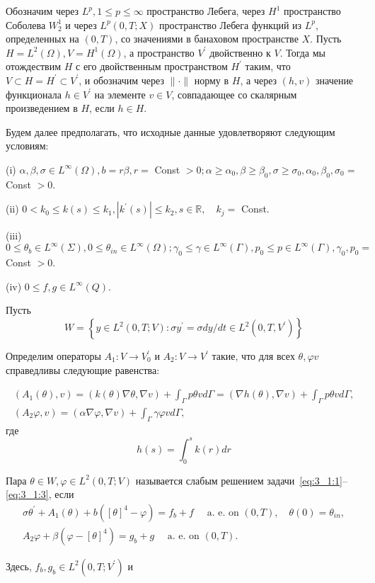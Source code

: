 Обозначим через $L^{p}, 1 \leq p \leq \infty$ пространство Лебега, через $H^{1}$
пространство Соболева $W_{2}^{1}$ и через $L^ {p}(0, T ; X)$ пространство Лебега
функций из $L^{p}$, определенных на $(0, T)$,
со значениями в банаховом пространстве $X$.
Пусть $H=L^{2}(\Omega), V=H^{1}(\Omega)$, а пространство $V^{\prime}$ двойственно к $V$.
Тогда мы отождествим $H$ с его двойственным пространством $H^{\prime}$ таким,
что $V \subset H=H^{\prime} \subset V^{\prime}$, и обозначим через $\|\cdot \|$ норму в $H$,
а через $(h, v)$ значение функционала $h \in V^{\prime}$ на элементе $v \in V$,
совпадающее со скалярным произведением в $ H$, если $h \in H$.


Будем далее предполагать, что исходные данные удовлетворяют следующим условиям:

(i) $\alpha, \beta, \sigma \in L^{\infty}(\Omega), b=r \beta, r=$ Const $>0;
\alpha \geq \alpha_{0}, \beta \geq \beta_{0},
\sigma \geq \sigma_{0}, \alpha_{0}, \beta_{0}, \sigma_{0}=$ Const $>0$.

(ii) $0<k_{0} \leq k(s) \leq k_{1},\left|k^{\prime}(s)\right| \leq k_{2}, s \in \mathbb{R},
\quad k_{j}=$ Const.

(iii) $0 \leq \theta_{b} \in L^{\infty}(\Sigma), 0 \leq \theta_{i n} \in L^{\infty}(\Omega);
\gamma_{0} \leq \gamma \in L^{\infty}(\Gamma),
p_{0} \leq p \in L^{\infty}(\Gamma), \gamma_{0}, p_{0}=$ Const $>0$.

(iv) $0 \leq f, g \in L^{\infty}(Q)$.

Пусть
\[
    W=\left\{y \in L^{2}(0, T ; V): \sigma y^{\prime}=\sigma d y / d t
    \in L^{2}\left(0, T, V^{\prime}\right)\right\}
\]

Определим операторы $A_{1}: V \rightarrow V_{0}^{\prime}$ и $A_{2}: V \rightarrow V^{\prime}$ такие,
что для всех $\theta, \varphi v$ справедливы следующие равенства:

\[
    \begin{gathered}
        \left(A_{1}(\theta), v\right)=(k(\theta) \nabla \theta, \nabla v)
        +\int_{\Gamma} p \theta v d \Gamma=(\nabla h(\theta), \nabla v)+\int_{\Gamma} p \theta v d \Gamma, \\
        \left(A_{2} \varphi, v\right)=(\alpha \nabla \varphi, \nabla v)
        +\int_{\Gamma} \gamma \varphi v d \Gamma,
    \end{gathered}
\]
где
\[
    h(s)=\int_{0}^{s} k(r) d r
\]

\begin{definition}
Пара $\theta \in W, \varphi \in L^{2}(0, T ; V)$ называется слабым решением
задачи~\eqref{eq:3_1:1}--\eqref{eq:3_1:3}, если
\begin{gather}
    \sigma \theta^{\prime}+A_{1}(\theta)
    +b\left([\theta]^{4}-\varphi\right)=f_{b}+f
    \quad \text { a. e. on }(0, T),
    \quad \theta(0)=\theta_{i n}, \label{eq:3_1:4}\\
    A_{2} \varphi+\beta\left(\varphi-[\theta]^{4}\right)=
    g_{b}+g \quad \text { a. e. on }(0, T). \label{eq:3_1:5}
\end{gather}

\end{definition}
Здесь, $f_{b}, g_{b} \in L^{2}\left(0, T ; V^{\prime}\right)$ и

